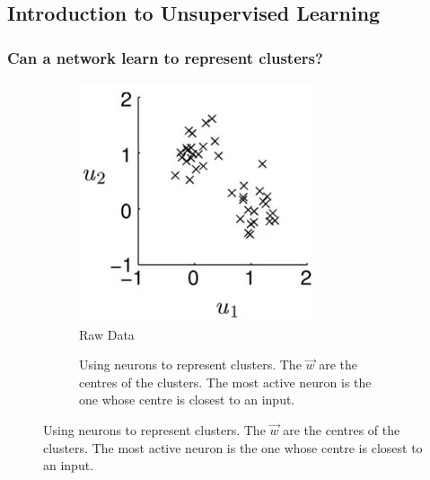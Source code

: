 \documentclass[]{article}
\begin{document}
\subsection{Introduction to Unsupervised Learning}

\subsubsection{Can a network learn to represent clusters?}
\begin{figure}[H]
	\caption{Can a network learn to represent clusters?}
	\begin{subfigure}[t]{0.45\textwidth}
		\caption{Raw Data}
		\includegraphics[width=\textwidth]{clustered-data}
	\end{subfigure}
	\begin{subfigure}[t]{0.45\textwidth}
		\caption{Using neurons to represent clusters. The $\vec{w}$ are the centres of the clusters. The most active neuron is the one whose centre is closest to an input.}

\end{subfigure}
\end{figure}
\end{document}
